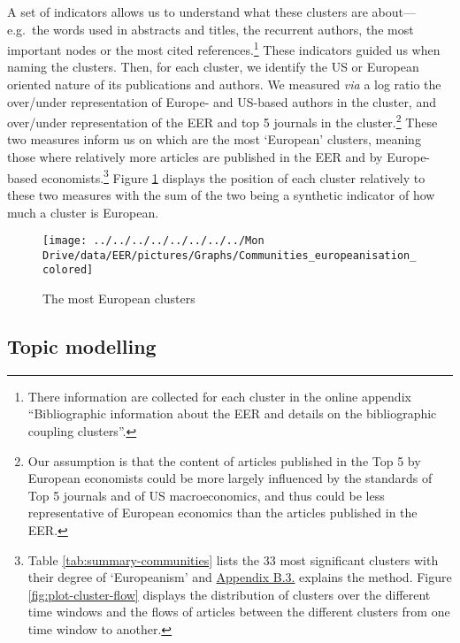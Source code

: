 \documentclass[
]{article}
\begin{document}
A set of indicators allows us to understand what these clusters are
about---e.g.~the words used in abstracts and titles, the recurrent
authors, the most important nodes or the most cited
references.\footnote{There information are collected for each cluster in
  the online appendix ``Bibliographic information about the EER and
  details on the bibliographic coupling clusters''.} These indicators
guided us when naming the clusters. Then, for each cluster, we identify
the US or European oriented nature of its publications and authors. We
measured \emph{via} a log ratio the over/under representation of Europe-
and US-based authors in the cluster, and over/under representation of
the EER and top 5 journals in the cluster.\footnote{Our assumption is
  that the content of articles published in the Top 5 by European
  economists could be more largely influenced by the standards of Top 5
  journals and of US macroeconomics, and thus could be less
  representative of European economics than the articles published in
  the EER.} These two measures inform us on which are the most
`European' clusters, meaning those where relatively more articles are
published in the EER and by Europe-based economists.\footnote{Table
  \ref{tab:summary-communities} lists the 33 most significant clusters
  with their degree of `Europeanism' and
  \protect\hyperlink{network}{Appendix B.3.} explains the method. Figure
  \ref{fig:plot-cluster-flow} displays the distribution of clusters over
  the different time windows and the flows of articles between the
  different clusters from one time window to another.} Figure
\ref{fig:plot-community-diff} displays the position of each cluster
relatively to these two measures with the sum of the two being a
synthetic indicator of how much a cluster is European.

\begin{figure}[h]

{\centering \texttt{[image: ../../../../../../../../Mon Drive/data/EER/pictures/Graphs/Communities\_europeanisation\_colored]} 

}

\caption{The most European clusters}\label{fig:plot-community-diff}
\end{figure}

\hypertarget{topic-modelling}{%
\subsection{Topic modelling}\label{topic-modelling}}
\end{document}
